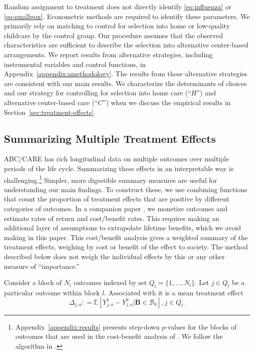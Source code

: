 Random assignment to treatment does not directly identify \eqref{eq:influenza} or \eqref{eq:smallpox}. Econometric methods are required to identify these parameters. We primarily rely on matching to control for selection into home or low-quality childcare by the control group. Our procedure assumes that the observed characteristics are sufficient to describe the selection into alternative center-based arrangements. We report results from alternative strategies, including instrumental variables and control functions, in Appendix~\ref{appendix:amethodology}. The results from these alternative strategies are consistent with our main results. We characterize the determinants of choices and our strategy for controlling for selection into home care (``$H$'') and alternative center-based care (``$C$'') when we discuss the empirical results in Section~\ref{sec:treatment-effects}.

\subsection{Summarizing Multiple Treatment Effects}\label{sec:combining-functions}

ABC/CARE has rich longitudinal data on multiple outcomes over multiple periods of the life cycle. Summarizing these effects in an interpretable way is challenging.\footnote{Appendix~\ref{appendix:results} presents step-down $p$-values for the blocks of outcomes that are used in the cost-benefit analysis of \citet{Garcia_Heckman_Leaf_etal_2017_Comp_CBA_Unpublished}. We follow the algorithm in \citet{Romano_Wolf_2016_pval_SaPL}.} Simpler, more digestible summary measures are useful for understanding our main findings. To construct these, we use combining functions that count the proportion of treatment effects that are positive by different categories of outcomes. In a companion paper \citep{Garcia_Heckman_Leaf_etal_2017_Comp_CBA_Unpublished}, we monetize outcomes and estimate rates of return and cost/benefit rates. This requires making an additional layer of assumptions to extrapolate lifetime benefits, which we avoid making in this paper. This cost/benefit analysis gives a weighted summary of the treatment effects, weighing by cost or benefit of the effect to society. The method described below does not weigh the individual effects by this or any other measure of ``importance.''

Consider a block of $N_l$ outcomes indexed by set $Q_l = \{1,\dots,N_l\}$. Let $j \in Q_l$ be a particular outcome within block $l$. Associated with it is a mean treatment effect
\begin{equation}
\Delta_{j,a} : = \mathbb{E} \left[ Y^1_{j,a} - Y^0_{j,a} | \bm{B} \in \mathcal{B}_0 \right], j \in Q_l.
\end{equation}

